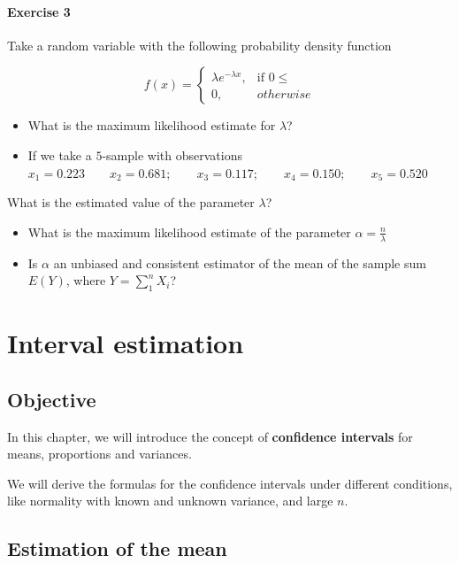 \documentclass[
]{book}
\begin{document}
\hypertarget{exercise-3-6}{%
\subsubsection{Exercise 3}\label{exercise-3-6}}

Take a random variable with the following probability density function

\[
    f(x)= 
\begin{cases}
    \lambda e^{-\lambda x},& \text{if } 0 \leq\\
    0,& otherwise 
\end{cases}
\]

\begin{itemize}
\item
  What is the maximum likelihood estimate for \(\lambda\)?
\item
  If we take a \(5\)-sample with observations
  \(x_1 = 0.223 \qquad x_2 = 0.681; \qquad x_3 = 0.117; \qquad x_4 = 0.150; \qquad x_5 = 0.520\)
\end{itemize}

What is the estimated value of the parameter \(\lambda\)?

\begin{itemize}
\item
  What is the maximum likelihood estimate of the parameter \(\alpha=\frac{n}{\lambda}\)
\item
  Is \(\alpha\) an unbiased and consistent estimator of the mean of the sample sum \(E(Y)\), where \(Y=\sum_1^n X_i\)?
\end{itemize}

\hypertarget{interval-estimation}{%
\chapter{Interval estimation}\label{interval-estimation}}

\hypertarget{objective-8}{%
\section{Objective}\label{objective-8}}

In this chapter, we will introduce the concept of \textbf{confidence intervals} for means, proportions and variances.

We will derive the formulas for the confidence intervals under different conditions, like normality with known and unknown variance, and large \(n\).

\hypertarget{estimation-of-the-mean}{%
\section{Estimation of the mean}\label{estimation-of-the-mean}}
\end{document}

